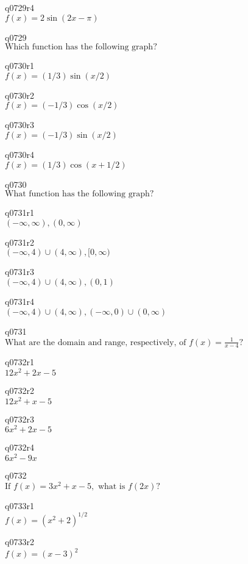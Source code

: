 q0729r4\\
\(\displaystyle f(x) = 2\sin(2x - \pi) \)

q0729\\
\(\displaystyle \text{Which function has the following graph?} \)

q0730r1\\
\(\displaystyle f(x) = (1/3)\sin(x/2) \)

q0730r2\\
\(\displaystyle f(x) = (-1/3)\cos(x/2) \)

q0730r3\\
\(\displaystyle f(x) = (-1/3)\sin(x/2) \)

q0730r4\\
\(\displaystyle f(x) = (1/3)\cos(x + 1/2) \)

q0730\\
\(\displaystyle \text{What function has the following graph?} \)

q0731r1\\
\(\displaystyle (-\infty, \infty), (0, \infty) \)

q0731r2\\
\(\displaystyle (-\infty, 4) \cup (4, \infty), [0, \infty) \)

q0731r3\\
\(\displaystyle (-\infty, 4) \cup (4, \infty), (0, 1) \)

q0731r4\\
\(\displaystyle (-\infty, 4) \cup (4, \infty), (-\infty, 0) \cup (0, \infty) \)

q0731\\
\(\displaystyle \text{What are the domain and range, respectively, of } f(x) = \frac{1}{x-4}? \)

q0732r1\\
\(\displaystyle 12x^2 + 2x - 5 \)

q0732r2\\
\(\displaystyle 12x^2 + x - 5 \)

q0732r3\\
\(\displaystyle 6x^2 + 2x - 5 \)

q0732r4\\
\(\displaystyle 6x^2 - 9x \)

q0732\\
\(\displaystyle \text{If } f(x) = 3x^2 + x - 5, \text{ what is } f(2x)? \)

q0733r1\\
\(\displaystyle f(x) = (x^2 + 2)^{1/2} \)

q0733r2\\
\(\displaystyle f(x) = (x-3)^2 \)

